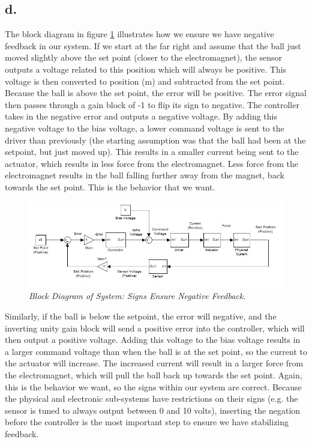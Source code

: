 \documentclass{article}
\theoremstyle{plain}
\theoremstyle{definition}
\theoremstyle{remark}
\begin{document}
\subsection*{d.}
The block diagram in figure \ref{Q2_d} illustrates how we ensure we have negative feedback in our system. If we start at the far right and assume that the ball just moved slightly above the set point (closer to the electromagnet), the sensor outputs a voltage related to this position which will always be positive. This voltage is then converted to position (m) and subtracted from the set point. Because the ball is above the set point, the error will be positive. The error signal then passes through a gain block of -1 to flip its sign to negative. The controller takes in the negative error and outputs a negative voltage. By adding this negative voltage to the bias voltage, a lower command voltage is sent to the driver than previously (the starting assumption was that the ball had been at the setpoint, but just moved up). This results in a smaller current being sent to the actuator, which results in less force from the electromagnet. Less force from the electromagnet results in the ball falling further away from the magnet, back towards the set point. This is the behavior that we want.

\begin{figure}[h!]
\begin{center}
\includegraphics[width = 15cm]{BlockDiagram}
\caption{\emph{Block Diagram of System: Signs Ensure Negative Feedback.}}
\label{Q2_d}
\end{center}
\end{figure}


Similarly, if the ball is below the setpoint, the error will negative, and the inverting unity gain block will send a positive error into the controller, which will then output a positive voltage. Adding this voltage to the bias voltage results in a larger command voltage than when the ball is at the set point, so the current to the actuator will increase. The increased current will result in a larger force from the electromagnet, which will pull the ball back up towards the set point. Again, this is the behavior we want, so the signs within our system are correct. Because the physical and electronic sub-systems have restrictions on their signs (e.g. the sensor is tuned to always output between 0 and 10 volts), inserting the negation before the controller is the most important step to ensure we have stabilizing feedback. 
\end{document}
